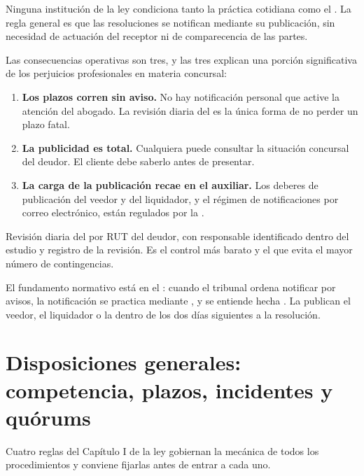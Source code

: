 Ninguna institución de la ley condiciona tanto la práctica cotidiana como el
\boletin{}. La regla general es que las resoluciones se notifican mediante su
publicación, sin necesidad de actuación del receptor ni de comparecencia de las partes.

Las consecuencias operativas son tres, y las tres explican una porción significativa de
los perjuicios profesionales en materia concursal:

\begin{enumerate}
  \item \textbf{Los plazos corren sin aviso.} No hay notificación personal que active la
  atención del abogado. La revisión diaria del \boletin{} es la única forma de no perder
  un plazo fatal.

  \item \textbf{La publicidad es total.} Cualquiera puede consultar la situación
  concursal del deudor. El cliente debe saberlo antes de presentar.

  \item \textbf{La carga de la publicación recae en el auxiliar.} Los deberes de
  publicación del veedor y del liquidador, y el régimen de notificaciones por correo
  electrónico, están regulados por la  \citeyearpar{ncg-14}.
\end{enumerate}

\begin{foco}
Revisión diaria del \boletin{} por RUT del deudor, con responsable identificado dentro del
estudio y registro de la revisión. Es el control más barato y el que evita el mayor
número de contingencias.
\end{foco}

El fundamento normativo está en el : cuando el tribunal ordena notificar por avisos, la
notificación se practica mediante , y se entiende hecha
. La publican el veedor, el liquidador o la \superir{}
dentro de los dos días siguientes a la resolución.

\section{Disposiciones generales: competencia, plazos, incidentes y quórums}

Cuatro reglas del Capítulo I de la ley gobiernan la mecánica de todos los procedimientos y
conviene fijarlas antes de entrar a cada uno.

